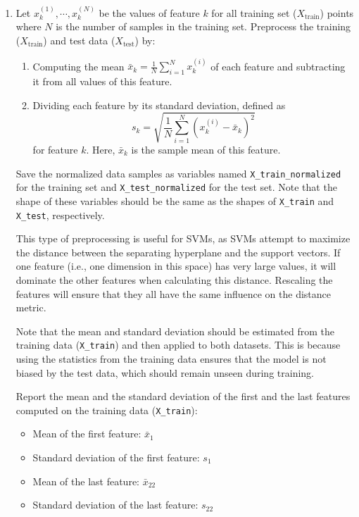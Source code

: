 \documentclass[a3paper,12pt]{extarticle} %
\begin{document}
\begin{enumerate}
    \item  Let $x^{(1)}_k, \cdots, x^{(N)}_k$ be the values of feature $k$ for all training set ($X_{\text{train}}$) points where $N$ is the number of samples in the training set. Preprocess the training ($X_{\text{train}}$) and test data ($X_{\text{test}}$) by:
    \begin{enumerate}
        \item Computing the mean $\bar{x}_k = \frac{1}{N} \sum_{i=1}^{N} x^{(i)}_k$ of each feature and subtracting it from all values of this feature.
        \item Dividing each feature by its standard deviation, defined as
        \[
        s_k = \sqrt{\frac{1}{N} \sum_{i=1}^{N} (x^{(i)}_k - \bar{x}_k)^2}
        \]
        for feature $k$. Here, $\bar{x}_k$ is the sample mean of this feature.
    \end{enumerate}
    Save the normalized data samples as variables named \texttt{X\_train\_normalized} for the training set and \texttt{X\_test\_normalized} for the test set. Note that the shape of these variables should be the same as the shapes of \texttt{X\_train} and \texttt{X\_test}, respectively.

    This type of preprocessing is useful for SVMs, as SVMs attempt to maximize the distance between the separating hyperplane and the support vectors. If one feature (i.e., one dimension in this space) has very large values, it will dominate the other features when calculating this distance. Rescaling the features will ensure that they all have the same influence on the distance metric.

    Note that the mean and standard deviation should be estimated from the training data (\texttt{X\_train}) and then applied to both datasets. This is because using the statistics from the training data ensures that the model is not biased by the test data, which should remain unseen during training.

    Report the mean and the standard deviation of the first and the last features computed on the training data (\texttt{X\_train}):
    \begin{itemize}
        \item Mean of the first feature: $\bar{x}_1$
        \item Standard deviation of the first feature: $s_1$
        \item Mean of the last feature: $\bar{x}_{22}$
        \item Standard deviation of the last feature: $s_{22}$
    \end{itemize}
\end{enumerate}
\end{document}
